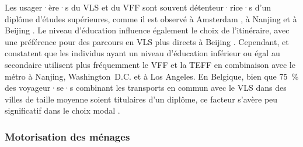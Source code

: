 \begin{refsegment}
Les usager·ère·s du \acrshort{VLS} et du \acrshort{VFF} sont souvent détenteur·rice·s d'un diplôme d'études supérieures, comme il est observé à Amsterdam \textcolor{blue}{\autocite[47-49]{nat_bicycle_2018}}, à Nanjing \textcolor{blue}{\autocite[5]{yang_empirical_2016}} et à Beijing \textcolor{blue}{\autocite[10]{guo_exploring_2023}}. Le niveau d'éducation influence également le choix de l'itinéraire, avec une préférence pour des parcours en \acrshort{VLS} plus directs à Beijing \textcolor{blue}{\autocite[10]{zhao_public_2022}}. Cependant, \textcolor{blue}{\textcite[11]{liu_use_2020}} et \textcolor{blue}{\textcite[9, 12]{yan_evaluating_2023}} constatent que les individus ayant un niveau d'éducation inférieur ou égal au secondaire utilisent plus fréquemment le \acrshort{VFF} et la \acrshort{TEFF} en combinaison avec le métro à Nanjing, Washington~D.C. et à Los Angeles. En Belgique, bien que 75~\% des voyageur·se·s combinant les transports en commun avec le \acrshort{VLS} dans des villes de taille moyenne soient titulaires d'un diplôme, ce facteur s'avère peu significatif dans le choix modal \textcolor{blue}{\autocite[6, 8]{adnan_last-mile_2019}}.%

\subsubsection*{Motorisation des ménages
    \label{chap2:motorisation}
    }
    

\end{refsegment}
